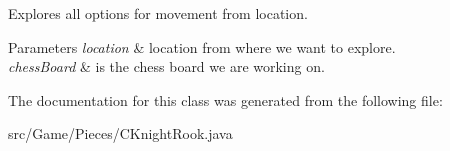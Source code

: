 Explores all options for movement from location.


\begin{DoxyParams}{Parameters}
{\em location} & location from where we want to explore. \\
\hline
{\em chess\+Board} & is the chess board we are working on. \\
\hline
\end{DoxyParams}


The documentation for this class was generated from the following file\+:\begin{DoxyCompactItemize}
\item 
src/\+Game/\+Pieces/C\+Knight\+Rook.\+java\end{DoxyCompactItemize}
